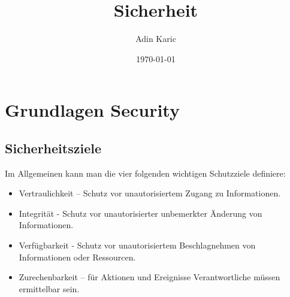 \documentclass[11pt]{scrartcl}
\title{Sicherheit}
\author{Adin Karic}
\date{\today{}}
\begin{document}
\maketitle
\pagebreak
\tableofcontents
\pagebreak

\section{Grundlagen Security}
\label{sec:basics-security-process}

\subsection{Sicherheitsziele}
\label{sec:security goals}
Im Allgemeinen kann man die vier folgenden wichtigen Schutzziele definiere\cite{1}:\\
\begin{itemize}
\item Vertraulichkeit – Schutz vor unautorisiertem Zugang zu Informationen.
\item Integrität - Schutz vor unautorisierter unbemerkter Änderung von Informationen.
\item Verfügbarkeit - Schutz vor unautorisiertem Beschlagnehmen von Informationen oder Ressourcen.
\item Zurechenbarkeit – für Aktionen und Ereignisse Verantwortliche müssen ermittelbar sein.
\end{itemize}
\end{document}
